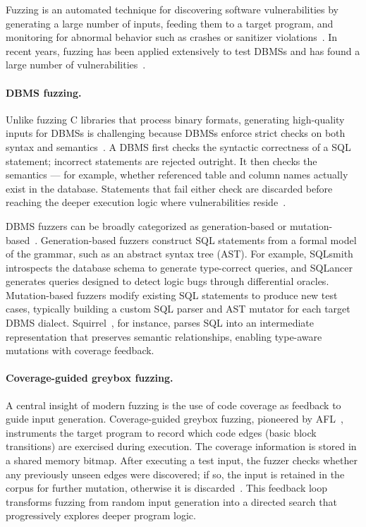 Fuzzing is an automated technique for discovering software vulnerabilities by generating a large number of inputs, feeding them to a target program, and monitoring for abnormal behavior such as crashes or sanitizer violations~\citep{fuzzingsurvey}. In recent years, fuzzing has been applied extensively to test DBMSs and has found a large number of vulnerabilities~\citep{griffin}.

\paragraph{DBMS fuzzing.}
Unlike fuzzing C libraries that process binary formats, generating high-quality inputs for DBMSs is challenging because DBMSs enforce strict checks on both syntax and semantics~\citep{griffin}. A DBMS first checks the syntactic correctness of a SQL statement; incorrect statements are rejected outright. It then checks the semantics --- for example, whether referenced table and column names actually exist in the database. Statements that fail either check are discarded before reaching the deeper execution logic where vulnerabilities reside~\citep{griffin}.

DBMS fuzzers can be broadly categorized as generation-based or mutation-based~\citep{griffin}. Generation-based fuzzers construct SQL statements from a formal model of the grammar, such as an abstract syntax tree (AST). For example, SQLsmith~\citep{sqlsmith} introspects the database schema to generate type-correct queries, and SQLancer~\citep{sqlancer} generates queries designed to detect logic bugs through differential oracles. Mutation-based fuzzers modify existing SQL statements to produce new test cases, typically building a custom SQL parser and AST mutator for each target DBMS dialect. Squirrel~\citep{squirrel}, for instance, parses SQL into an intermediate representation that preserves semantic relationships, enabling type-aware mutations with coverage feedback.

\paragraph{Coverage-guided greybox fuzzing.}
A central insight of modern fuzzing is the use of code coverage as feedback to guide input generation. Coverage-guided greybox fuzzing, pioneered by AFL~\citep{afl}, instruments the target program to record which code edges (basic block transitions) are exercised during execution. The coverage information is stored in a shared memory bitmap. After executing a test input, the fuzzer checks whether any previously unseen edges were discovered; if so, the input is retained in the corpus for further mutation, otherwise it is discarded~\citep{fuzzingsurvey}. This feedback loop transforms fuzzing from random input generation into a directed search that progressively explores deeper program logic.

